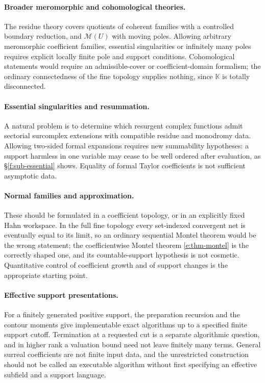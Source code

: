 \documentclass[11pt,a4paper]{article}
\numberwithin{equation}{section}
\theoremstyle{definition}
\theoremstyle{remark}
\theoremstyle{plain}
\newcommand{\K}{\mathbb K}
\newcommand{\Mc}{\mathcal M}
\begin{document}
\paragraph{Broader meromorphic and cohomological theories.}
The residue theory covers quotients of coherent families with a
controlled boundary reduction, and $\Mc(U)$ with moving poles.  Allowing
arbitrary meromorphic coefficient families, essential singularities or
infinitely many poles requires explicit locally finite pole and support
conditions.  Cohomological statements would require an admissible-cover
or coefficient-domain formalism; the ordinary connectedness of the fine
topology supplies nothing, since $\K$ is totally disconnected.

\paragraph{Essential singularities and resummation.}
A natural problem is to determine which resurgent complex functions
admit sectorial surcomplex extensions with compatible residue and
monodromy data.  Allowing two-sided formal expansions requires new
summability hypotheses: a support harmless in one variable may cease to
be well ordered after evaluation, as \S\ref{f:sub-essential} shows.
Equality of formal Taylor coefficients is not sufficient asymptotic
data.

\paragraph{Normal families and approximation.}
These should be formulated in a coefficient topology, or in an
explicitly fixed Hahn workspace.  In the full fine topology every
set-indexed convergent net is eventually equal to its limit, so an
ordinary sequential Montel theorem would be the wrong statement; the
coefficientwise Montel theorem \ref{e:thm-montel} is the correctly
shaped one, and its countable-support hypothesis is not cosmetic.
Quantitative control of coefficient growth and of support changes is the
appropriate starting point.

\paragraph{Effective support presentations.}
For a finitely generated positive support, the preparation recursion and
the contour moments give implementable exact algorithms up to a
specified finite support cutoff.  Termination at a requested cut is a
separate algorithmic question, and in higher rank a valuation bound need
not leave finitely many terms.  General surreal coefficients are not
finite input data, and the unrestricted construction should not be
called an executable algorithm without first specifying an effective
subfield and a support language.
\end{document}
